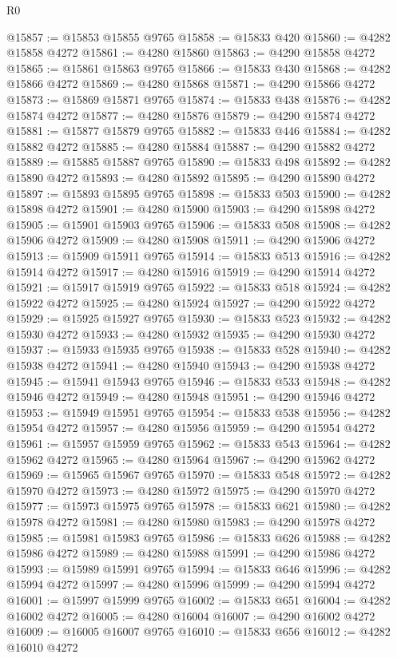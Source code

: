 \begin{lexlean}{R0}
\begin{coremodule}
@15857 := @15853 @15855 @9765
@15858 := @15833 @420
@15860 := @4282 @15858 @4272
@15861 := @4280 @15860
@15863 := @4290 @15858 @4272
@15865 := @15861 @15863 @9765
@15866 := @15833 @430
@15868 := @4282 @15866 @4272
@15869 := @4280 @15868
@15871 := @4290 @15866 @4272
@15873 := @15869 @15871 @9765
@15874 := @15833 @438
@15876 := @4282 @15874 @4272
@15877 := @4280 @15876
@15879 := @4290 @15874 @4272
@15881 := @15877 @15879 @9765
@15882 := @15833 @446
@15884 := @4282 @15882 @4272
@15885 := @4280 @15884
@15887 := @4290 @15882 @4272
@15889 := @15885 @15887 @9765
@15890 := @15833 @498
@15892 := @4282 @15890 @4272
@15893 := @4280 @15892
@15895 := @4290 @15890 @4272
@15897 := @15893 @15895 @9765
@15898 := @15833 @503
@15900 := @4282 @15898 @4272
@15901 := @4280 @15900
@15903 := @4290 @15898 @4272
@15905 := @15901 @15903 @9765
@15906 := @15833 @508
@15908 := @4282 @15906 @4272
@15909 := @4280 @15908
@15911 := @4290 @15906 @4272
@15913 := @15909 @15911 @9765
@15914 := @15833 @513
@15916 := @4282 @15914 @4272
@15917 := @4280 @15916
@15919 := @4290 @15914 @4272
@15921 := @15917 @15919 @9765
@15922 := @15833 @518
@15924 := @4282 @15922 @4272
@15925 := @4280 @15924
@15927 := @4290 @15922 @4272
@15929 := @15925 @15927 @9765
@15930 := @15833 @523
@15932 := @4282 @15930 @4272
@15933 := @4280 @15932
@15935 := @4290 @15930 @4272
@15937 := @15933 @15935 @9765
@15938 := @15833 @528
@15940 := @4282 @15938 @4272
@15941 := @4280 @15940
@15943 := @4290 @15938 @4272
@15945 := @15941 @15943 @9765
@15946 := @15833 @533
@15948 := @4282 @15946 @4272
@15949 := @4280 @15948
@15951 := @4290 @15946 @4272
@15953 := @15949 @15951 @9765
@15954 := @15833 @538
@15956 := @4282 @15954 @4272
@15957 := @4280 @15956
@15959 := @4290 @15954 @4272
@15961 := @15957 @15959 @9765
@15962 := @15833 @543
@15964 := @4282 @15962 @4272
@15965 := @4280 @15964
@15967 := @4290 @15962 @4272
@15969 := @15965 @15967 @9765
@15970 := @15833 @548
@15972 := @4282 @15970 @4272
@15973 := @4280 @15972
@15975 := @4290 @15970 @4272
@15977 := @15973 @15975 @9765
@15978 := @15833 @621
@15980 := @4282 @15978 @4272
@15981 := @4280 @15980
@15983 := @4290 @15978 @4272
@15985 := @15981 @15983 @9765
@15986 := @15833 @626
@15988 := @4282 @15986 @4272
@15989 := @4280 @15988
@15991 := @4290 @15986 @4272
@15993 := @15989 @15991 @9765
@15994 := @15833 @646
@15996 := @4282 @15994 @4272
@15997 := @4280 @15996
@15999 := @4290 @15994 @4272
@16001 := @15997 @15999 @9765
@16002 := @15833 @651
@16004 := @4282 @16002 @4272
@16005 := @4280 @16004
@16007 := @4290 @16002 @4272
@16009 := @16005 @16007 @9765
@16010 := @15833 @656
@16012 := @4282 @16010 @4272

\end{coremodule}
\end{lexlean}
